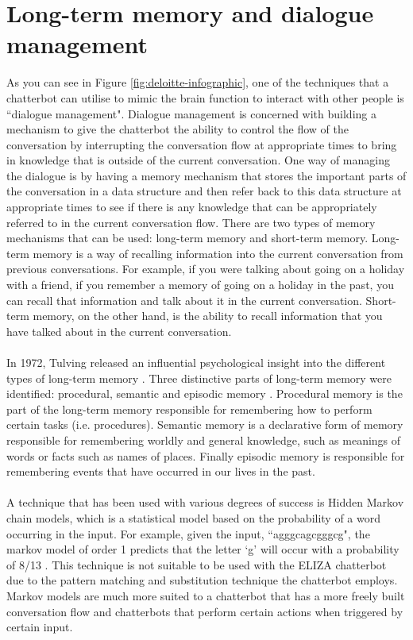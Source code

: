 \section{Long-term memory and dialogue management} \label{section: long-term-memory}
As you can see in Figure \ref{fig:deloitte-infographic}, one of the techniques that a chatterbot can utilise to mimic the brain function to interact with other people is ``dialogue management". Dialogue management is concerned with building a mechanism to give the chatterbot the ability to control the flow of the conversation by interrupting the conversation flow at appropriate times to bring in knowledge that is outside of the current conversation. One way of managing the dialogue is by having a memory mechanism that stores the important parts of the conversation in a data structure and then refer back to this data structure at appropriate times to see if there is any knowledge that can be appropriately referred to in the current conversation flow. There are two types of memory mechanisms that can be used: long-term memory and short-term memory. Long-term memory is a way of recalling information into the current conversation from previous conversations. For example, if you were talking about going on a holiday with a friend, if you remember a memory of going on a holiday in the past, you can recall that information and talk about it in the current conversation. Short-term memory, on the other hand, is the ability to recall information that you have talked about in the current conversation.\\\\
In 1972, Tulving released an influential psychological insight into the different types of long-term memory \autocite{tulving1972episodic}. Three distinctive parts of long-term memory were identified: procedural, semantic and episodic memory \autocite{mcleod_2010}. Procedural memory is the part of the long-term memory responsible for remembering how to perform certain tasks (i.e. procedures). Semantic memory is a declarative form of memory responsible for remembering worldly and general knowledge, such as meanings of words or facts such as names of places. Finally episodic memory is responsible for remembering events that have occurred in our lives in the past.\\\\
A technique that has been used with various degrees of success is Hidden Markov chain models, which is a statistical model based on the probability of a word occurring in the input. For example, given the input, ``agggcagcgggcg", the markov model of order 1 predicts that the letter `g' will occur with a probability of 8/13 \autocite{bradevsko2012survey}. This technique is not suitable to be used with the ELIZA chatterbot due to the pattern matching and substitution technique the chatterbot employs. Markov models are much more suited to a chatterbot that has a more freely built conversation flow and chatterbots that perform certain actions when triggered by certain input.\\\\
